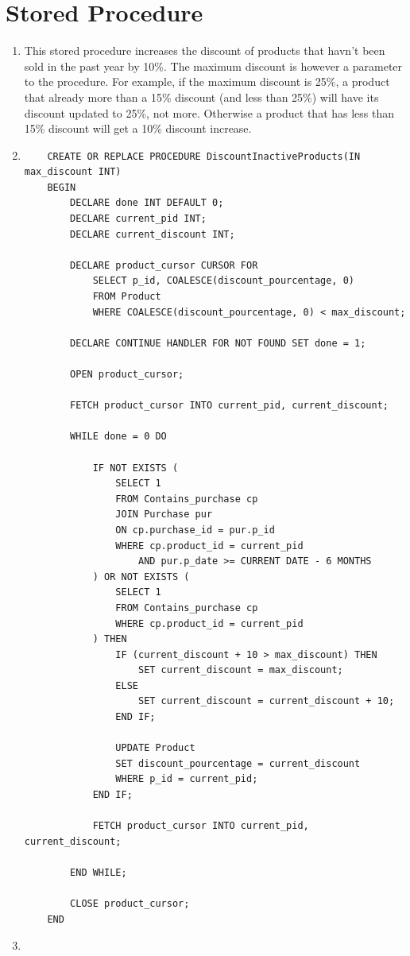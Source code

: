\documentclass[a4paper,11pt]{article}
\begin{document}
\section*{Stored Procedure}

\begin{enumerate}[label=(\alph*)]
    \item This stored procedure increases the discount of products that havn't been sold in the past year by 10\%. The maximum discount is however a parameter to the procedure. 
    For example, if the maximum discount is 25\%, a product that already more than a 15\% discount (and less than 25\%) will have its discount updated to 25\%, not more. 
    Otherwise a product that has less than 15\% discount will get a 10\% discount increase.
    \item 
    \begin{lstlisting}
    CREATE OR REPLACE PROCEDURE DiscountInactiveProducts(IN max_discount INT)
    BEGIN
        DECLARE done INT DEFAULT 0;
        DECLARE current_pid INT;
        DECLARE current_discount INT;
    
        DECLARE product_cursor CURSOR FOR
            SELECT p_id, COALESCE(discount_pourcentage, 0)
            FROM Product
            WHERE COALESCE(discount_pourcentage, 0) < max_discount;
    
        DECLARE CONTINUE HANDLER FOR NOT FOUND SET done = 1;
    
        OPEN product_cursor;
    
        FETCH product_cursor INTO current_pid, current_discount;
    
        WHILE done = 0 DO
    
            IF NOT EXISTS (
                SELECT 1
                FROM Contains_purchase cp
                JOIN Purchase pur 
                ON cp.purchase_id = pur.p_id
                WHERE cp.product_id = current_pid
                    AND pur.p_date >= CURRENT DATE - 6 MONTHS
            ) OR NOT EXISTS (
                SELECT 1
                FROM Contains_purchase cp
                WHERE cp.product_id = current_pid
            ) THEN
                IF (current_discount + 10 > max_discount) THEN
                    SET current_discount = max_discount;
                ELSE 
                    SET current_discount = current_discount + 10;
                END IF;
    
                UPDATE Product
                SET discount_pourcentage = current_discount
                WHERE p_id = current_pid;
            END IF;
    
            FETCH product_cursor INTO current_pid, current_discount;
    
        END WHILE;
    
        CLOSE product_cursor;
    END
    \end{lstlisting}
    
    \item 
\end{enumerate}
\end{document}
